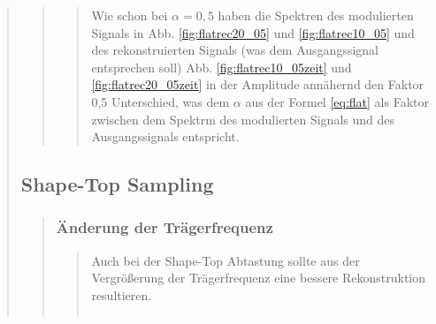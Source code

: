 \begin{quote}
\begin{quote}
\begin{quote}
            Wie schon bei $\alpha=0,5$ haben die Spektren des modulierten Signals in Abb. \ref{fig:flatrec20_05} und
            \ref{fig:flatrec10_05} und des rekonstruierten Signals (was dem Ausgangssignal entsprechen soll) Abb. \ref{fig:flatrec10_05zeit} und
            \ref{fig:flatrec20_05zeit} in der Amplitude annähernd den Faktor 0,5 Unterschied, was dem $\alpha$
            aus der Formel \ref{eq:flat} als Faktor zwischen dem Spektrm des modulierten Signals und des
            Ausgangssignals entspricht.
                        
             
        \end{quote}
    
    \end{quote}
    
    \subsection{Shape-Top Sampling}
    \begin{quote}
        
        
        \subsubsection{Änderung der Trägerfrequenz}
        \begin{quote}
            
            Auch bei der Shape-Top Abtastung sollte aus der Vergrößerung der Trägerfrequenz eine bessere
            Rekonstruktion resultieren.
            
            \begin{center}
            \begin{tabular}{ll}
            

\end{tabular}
\end{center}
\end{quote}
\end{quote}
\end{quote}

